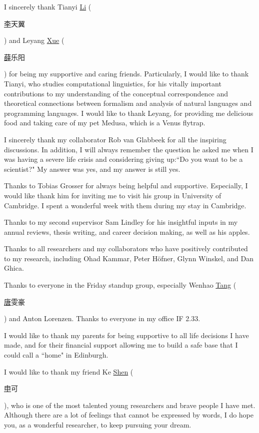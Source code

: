 \documentclass[phd,icsa,twoside,logo]{infthesis}
\begin{document}
\begin{preliminary}
\begin{acknowledgements}
I sincerely thank Tianyi \underline{Li} (\begin{CJK*}{UTF8}{gbsn}\underline{李}天翼\end{CJK*}) and Leyang \underline{Xue} (\begin{CJK*}{UTF8}{gbsn}\underline{薛}乐阳\end{CJK*}) for being my supportive and caring friends. Particularly, I would like to thank Tianyi, who studies computational linguistics, for his vitally important contributions to my understanding of the conceptual correspondence and theoretical connections between formalism and analysis of natural languages and programming languages. I would like to thank Leyang, for providing me delicious food and taking care of my pet Medusa, which is a Venus flytrap.

I sincerely thank my collaborator Rob van Glabbeek for all the inspiring discussions. In addition, I will always remember the question he asked me when I was having a severe life crisis and considering giving up:``Do you want to be a scientist?" My answer was yes, and my answer is still yes.

Thanks to Tobias Grosser for always being helpful and supportive. Especially, I would like thank him for inviting me to visit his group in University of Cambridge. I spent a wonderful week with them during my stay in Cambridge.

Thanks to my second supervisor Sam Lindley for his insightful inputs in my annual reviews, thesis writing, and career decision making, as well as his apples.

Thanks to all researchers and my collaborators who have positively contributed to my research, including Ohad Kammar, Peter H\"{o}fner, Glynn Winskel, and Dan Ghica.

Thanks to everyone in the Friday standup group, especially Wenhao \underline{Tang} (\begin{CJK*}{UTF8}{gbsn}\underline{唐}雯豪\end{CJK*}) and Anton Lorenzen. Thanks to everyone in my office IF 2.33.

I would like to thank my parents for being supportive to all life decisions I have made, and for their financial support allowing me to build a safe base that I could call a ``home" in Edinburgh.

I would like to thank my friend Ke \underline{Shen} (\begin{CJK*}{UTF8}{gbsn}\underline{申}可\end{CJK*}), who is one of the most talented young researchers and brave people I have met. Although there are a lot of feelings that cannot be expressed by words, I do hope you, as a wonderful researcher, to keep pursuing your dream.


\end{acknowledgements}
\end{preliminary}
\end{document}
